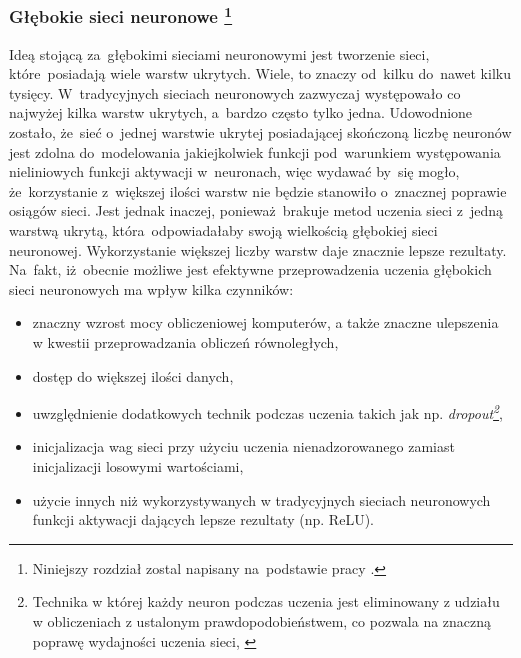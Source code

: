 \subsubsection[Głębokie sieci neuronowe]{Głębokie sieci neuronowe \footnote{Niniejszy rozdział zostal napisany na~podstawie pracy \cite{dnn1}. }}\label{dnn}
Ideą stojącą za~głębokimi sieciami neuronowymi jest tworzenie sieci, które~posiadają wiele warstw ukrytych. Wiele, to znaczy od~kilku do~nawet kilku tysięcy\cite{veryDeep}\cite{veryDeep2}. W~tradycyjnych sieciach neuronowych zazwyczaj występowało co najwyżej kilka warstw ukrytych, a~bardzo często tylko jedna. Udowodnione zostało, że~sieć o~jednej warstwie ukrytej posiadającej skończoną liczbę neuronów jest zdolna do~modelowania jakiejkolwiek funkcji pod~warunkiem występowania nieliniowych funkcji aktywacji w~neuronach\cite{anntheorem}, więc wydawać by~się mogło, że~korzystanie z~większej ilości warstw nie będzie stanowiło o~znacznej poprawie osiągów sieci. Jest jednak inaczej, ponieważ~brakuje metod uczenia sieci z~jedną warstwą ukrytą, która~odpowiadałaby swoją wielkością głębokiej sieci neuronowej. Wykorzystanie większej liczby warstw daje znacznie lepsze rezultaty. Na~fakt, iż~obecnie możliwe jest efektywne przeprowadzenia uczenia głębokich sieci neuronowych ma wpływ kilka czynników:
\begin{itemize}
\item znaczny wzrost mocy obliczeniowej komputerów, a także znaczne ulepszenia w kwestii przeprowadzania obliczeń równoległych,
\item dostęp do większej ilości danych,
\item uwzględnienie dodatkowych technik podczas uczenia takich jak np. \textit{dropout\footnote{Technika w której każdy neuron podczas uczenia jest eliminowany z udziału w obliczeniach z ustalonym prawdopodobieństwem, co pozwala na znaczną poprawę wydajności uczenia sieci, \cite{srivastava2014dropout}}},
\item inicjalizacja wag sieci przy użyciu uczenia nienadzorowanego zamiast inicjalizacji losowymi wartościami,
\item użycie innych niż wykorzystywanych w tradycyjnych sieciach neuronowych funkcji aktywacji dających lepsze rezultaty (np. ReLU).
\end{itemize}
